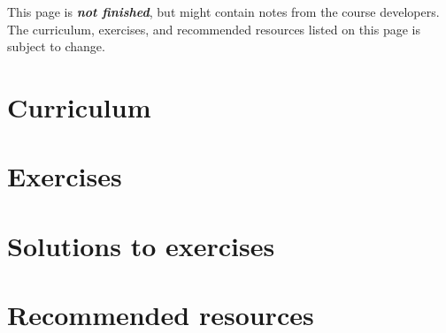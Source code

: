 \documentclass[
  letterpaper,
  DIV=11,
  numbers=noendperiod]{scrreprt}
\begin{document}
\begin{tcolorbox}[enhanced jigsaw, colbacktitle=quarto-callout-important-color!10!white, bottomrule=.15mm, toprule=.15mm, colback=white, coltitle=black, bottomtitle=1mm, colframe=quarto-callout-important-color-frame, opacitybacktitle=0.6, titlerule=0mm, left=2mm, title=\textcolor{quarto-callout-important-color}{\faExclamation}\hspace{0.5em}{Important}, opacityback=0, arc=.35mm, leftrule=.75mm, rightrule=.15mm, toptitle=1mm, breakable]

This page is \textbf{\emph{not finished}}, but might contain notes from
the course developers. The curriculum, exercises, and recommended
resources listed on this page is subject to change.

\end{tcolorbox}

\hypertarget{curriculum-11}{%
\section{Curriculum}\label{curriculum-11}}

\hypertarget{exercises-6}{%
\section{Exercises}\label{exercises-6}}

\hypertarget{solutions-to-exercises}{%
\section{Solutions to exercises}\label{solutions-to-exercises}}

\hypertarget{recommended-resources-9}{%
\section{Recommended resources}\label{recommended-resources-9}}
\end{document}
